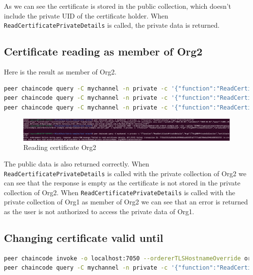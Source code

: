 \documentclass[12pt]{article}
\begin{document}
As we can see the certificate is stored in the public collection, which doesn't include the private UID of the certificate holder.
When \texttt{ReadCertificatePrivateDetails} is called, the private data is returned.

\subsection{Certificate reading as member of Org2}

Here is the result as member of Org2.

\begin{lstlisting}[language=bash]
peer chaincode query -C mychannel -n private -c '{"function":"ReadCertificate","Args":["certificate1"]}'
peer chaincode query -C mychannel -n private -c '{"function":"ReadCertificatePrivateDetails","Args":["Org2MSPPrivateCollection","certificate1"]}'
peer chaincode query -C mychannel -n private -c '{"function":"ReadCertificatePrivateDetails","Args":["Org1MSPPrivateCollection","certificate1"]}'
\end{lstlisting}

\begin{figure}[H]
    \centering
    \includegraphics[width=\textwidth]{imgs/reading_certificate_org2.PNG}
    \caption{Reading certificate Org2}
    \label{fig:readingcertificate}
\end{figure}

The public data is also returned correctly.
When \texttt{ReadCertificatePrivateDetails} is called with the private collection of Org2 we can see that the response is empty as the certificate is not stored in the private collection of Org2.
When \texttt{ReadCertificatePrivateDetails} is called with the private collection of Org1 as member of Org2 we can see that an error is returned as the user is not authorized to access the private data of Org1.

\subsection{Changing certificate valid until}

\begin{lstlisting}[language=bash]
peer chaincode invoke -o localhost:7050 --ordererTLSHostnameOverride orderer.example.com --tls --cafile "${PWD}/organizations/ordererOrganizations/example.com/orderers/orderer.example.com/msp/tlscacerts/tlsca.example.com-cert.pem" -C mychannel -n private -c '{"function":"ChangeCertificateValidUntil","Args":["certificate1", "2026-01-01"]}'
peer chaincode query -C mychannel -n private -c '{"function":"ReadCertificate","Args":["certificate1"]}'
\end{lstlisting}
\end{document}
